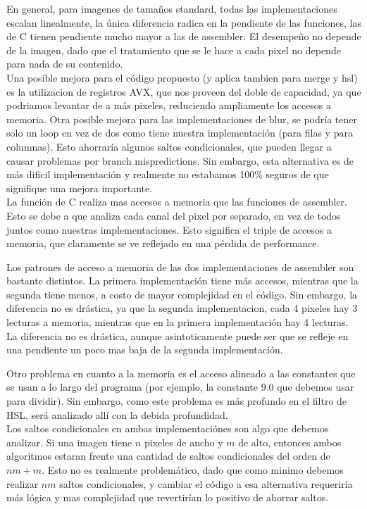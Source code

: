 En general, para imagenes de tamaños standard, todas las implementaciones escalan linealmente, la única diferencia radica en la pendiente de las funciones, las de C tienen pendiente mucho mayor a las de assembler. El desempeño no depende de la imagen, dado que el tratamiento que se le hace a cada pixel no depende para nada de su contenido.
\\

Una posible mejora para el código propuesto (y aplica tambien para merge y hsl) es la utilizacion de registros AVX, que nos proveen del doble de capacidad, ya que podriamos levantar de a más pixeles, reduciendo ampliamente los accesos a memoria.
Otra posible mejora para las implementaciones de blur, se podría tener solo un loop en vez de dos como tiene nuestra implementación (para filas y para columnas). Esto ahorraría algunos saltos condicionales, que pueden llegar a causar problemas por branch mispredictions.
Sin embargo, esta alternativa es de más dificil implementación y realmente no estabamos 100\% seguros de que signifique una mejora importante.
\\

La función de C realiza mas accesos a memoria que las funciones de assembler. Esto se debe a que analiza cada canal del pixel por separado, en vez de todos juntos como nuestras implementaciones. Esto significa el triple de accesos a memoria, que claramente se ve reflejado en una pérdida de performance.

Los patrones de acceso a memoria de las dos implementaciones de assembler son bastante distintos. La primera implementación tiene más accesos, mientras que la segunda tiene menos, a costo de mayor complejidad en el código. Sin embargo, la diferencia no es drástica, ya que la segunda implementacion, cada 4 pixeles hay 3 lecturas a memoria, mientras que en la primera implementación hay 4 lecturas. La diferencia no es drástica, aunque asintoticamente puede ser que se refleje en una pendiente un poco mas baja de la segunda implementación.

Otro problema en cuanto a la memoria es el acceso alineado a las constantes que se usan a lo largo del programa (por ejemplo, la constante 9.0 que debemos usar para dividir). Sin embargo, como este problema es más profundo en el filtro de HSL, será analizado allí con la debida profundidad.
\\

Los saltos condicionales en ambas implementaciónes son algo que debemos analizar. Si una imagen tiene $n$ pixeles de ancho y $m$ de alto, entonces ambos algoritmos estaran frente una cantidad de saltos condicionales del orden de $nm+m$.
Esto no es realmente problemático, dado que como minimo debemos realizar $nm$ saltos condicionales, y cambiar el código a esa alternativa requeriría más lógica y mas complejidad que revertirían lo positivo de ahorrar saltos.
\\

